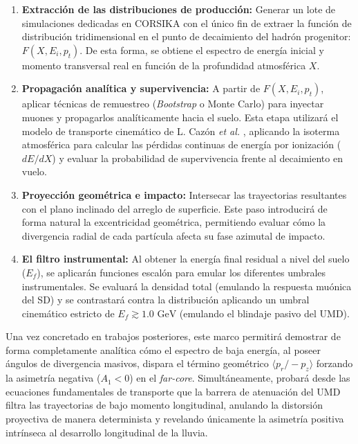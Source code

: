 \begin{enumerate}
	\item \textbf{Extracción de las distribuciones de producción:} Generar un lote de simulaciones dedicadas en CORSIKA con el único fin de extraer la función de distribución tridimensional en el punto de decaimiento del hadrón progenitor: $F(X, E_i, p_t)$. De esta forma, se obtiene el espectro de energía inicial y momento transversal real en función de la profundidad atmosférica $X$.
	
	\item \textbf{Propagación analítica y supervivencia:} A partir de $F(X, E_i, p_t)$, aplicar técnicas de remuestreo (\textit{Bootstrap} o Monte Carlo) para inyectar muones y propagarlos analíticamente hacia el suelo. Esta etapa utilizará el modelo de transporte cinemático de L. Cazón \textit{et al.} \cite{Cazon2012}, aplicando la isoterma atmosférica para calcular las pérdidas continuas de energía por ionización ($dE/dX$) y evaluar la probabilidad de supervivencia frente al decaimiento en vuelo.
	
	\item \textbf{Proyección geométrica e impacto:} Intersecar las trayectorias resultantes con el plano inclinado del arreglo de superficie. Este paso introducirá de forma natural la excentricidad geométrica, permitiendo evaluar cómo la divergencia radial de cada partícula afecta su fase azimutal de impacto.
	
	\item \textbf{El filtro instrumental:} Al obtener la energía final residual a nivel del suelo ($E_f$), se aplicarán funciones escalón para emular los diferentes umbrales instrumentales. Se evaluará la densidad total (emulando la respuesta muónica del SD) y se contrastará contra la distribución aplicando un umbral cinemático estricto de $E_f \gtrsim 1.0\text{ GeV}$ (emulando el blindaje pasivo del UMD).
\end{enumerate}

Una vez concretado en trabajos posteriores, este marco permitirá demostrar de forma completamente analítica cómo el espectro de baja energía, al poseer ángulos de divergencia masivos, dispara el término geométrico $\langle p_r / -p_z \rangle$ forzando la asimetría negativa ($A_1 < 0$) en el \textit{far-core}. Simultáneamente, probará desde las ecuaciones fundamentales de transporte que la barrera de atenuación del UMD filtra las trayectorias de bajo momento longitudinal, anulando la distorsión proyectiva de manera determinista y revelando únicamente la asimetría positiva intrínseca al desarrollo longitudinal de la lluvia.
\fi

